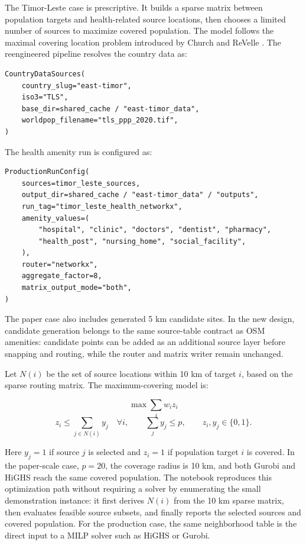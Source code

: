 \documentclass[11pt]{article}
\begin{document}
The Timor-Leste case is prescriptive.  It builds a sparse matrix between
population targets and health-related source locations, then chooses a limited
number of sources to maximize covered population.  The model follows the
maximal covering location problem introduced by Church and ReVelle
\cite{church-revelle-1974}.  The reengineered pipeline resolves the country
data as:

\begin{verbatim}
CountryDataSources(
    country_slug="east-timor",
    iso3="TLS",
    base_dir=shared_cache / "east-timor_data",
    worldpop_filename="tls_ppp_2020.tif",
)
\end{verbatim}

The health amenity run is configured as:

\begin{verbatim}
ProductionRunConfig(
    sources=timor_leste_sources,
    output_dir=shared_cache / "east-timor_data" / "outputs",
    run_tag="timor_leste_health_networkx",
    amenity_values=(
        "hospital", "clinic", "doctors", "dentist", "pharmacy",
        "health_post", "nursing_home", "social_facility",
    ),
    router="networkx",
    aggregate_factor=8,
    matrix_output_mode="both",
)
\end{verbatim}

The paper case also includes generated 5 km candidate sites.  In the new design,
candidate generation belongs to the same source-table contract as OSM amenities:
candidate points can be added as an additional source layer before snapping and
routing, while the router and matrix writer remain unchanged.

Let \(N(i)\) be the set of source locations within 10 km of target \(i\), based
on the sparse routing matrix.  The maximum-covering model is:

\[
\max \sum_i w_i z_i
\]
\[
z_i \le \sum_{j \in N(i)} y_j \quad \forall i,
\qquad
\sum_j y_j \le p,
\qquad
z_i, y_j \in \{0, 1\}.
\]

Here \(y_j=1\) if source \(j\) is selected and \(z_i=1\) if population target
\(i\) is covered.  In the paper-scale case, \(p=20\), the coverage radius is
10 km, and both Gurobi and HiGHS reach the same covered population.
The notebook reproduces this optimization path without requiring a solver by
enumerating the small demonstration instance: it first derives \(N(i)\) from the
10 km sparse matrix, then evaluates feasible source subsets, and finally reports
the selected sources and covered population.  For the production case, the same
neighborhood table is the direct input to a MILP solver such as HiGHS or Gurobi.
\end{document}
